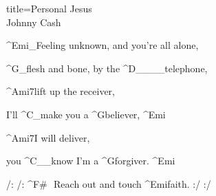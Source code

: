 \begin{song}{title=\centering Personal Jesus \\\normalsize Johnny Cash  \vspace*{-0.3cm}}
{\begin{minipage}[t]{0.48\textwidth}
\sloka
	^{Emi{\color{white}\_}}Feeling unknown, and you're all alone,

	^{G{\color{white}\_}}flesh and bone, by the ^{D{\color{white}\_\_\_\_}}telephone,

	^{Ami7}lift up the receiver,

	I'll ^{C{\color{white}\_}}make you a ^{G}believer, ^{Emi}

	^{Ami7}I will deliver,
	
	you ^{C{\color{white}\_\_}}know I'm a ^{G}forgiver. ^{Emi}


	/: /: ^{F\#\,\,\,\,}Reach out and touch ^{Emi}faith. :/ :/

\end{minipage}
}
\setcounter{Slokočet}{0}
\end{song}

	